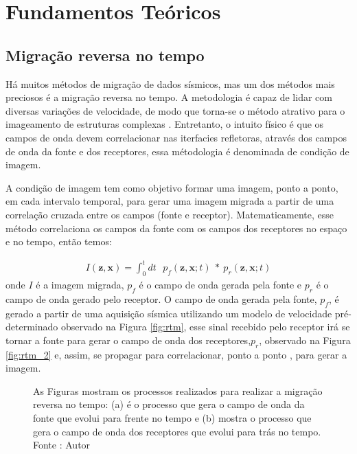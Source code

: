 \chapter{Fundamentos Teóricos}


\section{Migração reversa no tempo}

Há muitos métodos de migração de dados sísmicos, mas um dos métodos mais preciosos é a migração reversa no tempo. A metodologia é capaz de lidar com diversas variações de velocidade, de modo que torna-se o método atrativo para o imageamento de estruturas complexas \citep{baysal_1983}. Entretanto, o intuito físico é que os campos de onda devem correlacionar nas iterfacies refletoras, através dos campos de onda da fonte e dos receptores, essa métodologia é denominada de condição de imagem. 

A condição de imagem tem como objetivo formar uma imagem, ponto a ponto, em cada intervalo temporal, para gerar uma imagem migrada a partir de uma correlação cruzada entre os campos (fonte e receptor). Matematicamente, esse método correlaciona os campos da fonte com os campos dos receptores no espaço e no tempo, então temos:

\begin{eqnarray}
 I (\mathbf{z},\mathbf{x}) = \int_{0}^{t} dt~~~ p_{f}(\mathbf{z},\mathbf{x};t)~*~ p_{r}(\mathbf{z},\mathbf{x};t)
 \label{eq:correlation_rtm}
\end{eqnarray}
onde $I$ é a imagem migrada, $p_{f}$ é o campo de onda gerada pela fonte e $p_{r}$ é o campo de onda gerado pelo receptor. O campo de onda gerada pela fonte, $p_{f}$, é gerado a partir de uma aquisição sísmica utilizando um modelo de velocidade pré-determinado observado na Figura \ref{fig:rtm}, esse sinal recebido pelo receptor irá se tornar a fonte para gerar o campo de onda dos receptores,$p_{r}$, observado na Figura \ref{fig:rtm_2} e, assim, se propagar para correlacionar, ponto a ponto , para gerar a imagem.

\begin{figure}[h!]
\centering
{}
   
  \caption{As Figuras mostram os processos realizados para realizar a migração reversa no tempo: (a) é o processo que gera o campo de onda da fonte que evolui para frente no tempo e (b) mostra o processo que gera o campo de onda dos receptores que evolui para trás no tempo. Fonte : Autor }
\end{figure}

